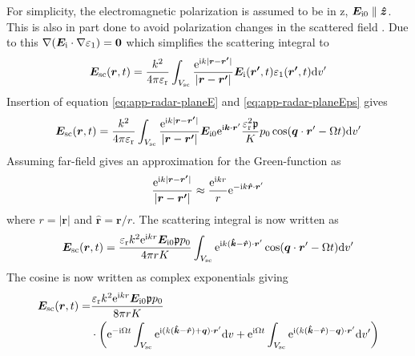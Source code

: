 \documentclass[11pt,twoside]{eitExjobb}
\begin{document}
	For simplicity, the electromagnetic polarization is assumed to be in z, $\bm{E}_{\mathrm{i}0} \parallel \bm{\hat{z}}$. This is also in part done to avoid polarization changes in the scattered field \cite{Korpel1988}. Due to this $\nabla(\bm{E}_{\mathrm{i}} \cdot \nabla \varepsilon_1) = \bm{0}$ which simplifies the scattering integral to
	\begin{equation*}
		\bm{E}_{\mathrm{sc}}(\bm{r},t) = \frac{k^2}{4\pi\varepsilon_{\mathrm{r}}} \int_{V_{\mathrm{sc}}} \frac{\mathrm{e}^{\mathrm{i} k |\bm{r}-\bm{r'}| }}{ |\bm{r}-\bm{r'}|} \bm{E}_{\mathrm{i}} (\bm{r'},t) \varepsilon_1 (\bm{r'},t) \mathrm{d}v'
	\end{equation*}
	Insertion of equation \eqref{eq:app-radar-planeE} and \eqref{eq:app-radar-planeEps} gives
	\begin{equation*}
		\bm{E}_{\mathrm{sc}}(\bm{r},t) = \frac{k^2}{4\pi\varepsilon_{\mathrm{r}}} \int_{V_{\mathrm{sc}}} \frac{\mathrm{e}^{\mathrm{i} k |\bm{r}-\bm{r'}| }}{ |\bm{r}-\bm{r'}|} \bm{E}_{\mathrm{i}0} \mathrm{e}^{\mathrm{i} \bm{k} \cdot \bm{r}'} \frac{\varepsilon_{\mathrm{r}}^2 \mathfrak{p}}{K} p_0 \cos(\bm{q} \cdot \bm{r}' - \Omega t) \mathrm{d}v'
	\end{equation*}
	Assuming far-field gives an approximation for the Green-function as \cite{Kristensson2008}
	\begin{equation*}
		\frac{\mathrm{e}^{\mathrm{i} k |\bm{r}-\bm{r'}| }}{ |\bm{r}-\bm{r'}|} \approx \frac{\mathrm{e}^{\mathrm{i} kr}}{r} \mathrm{e}^{-\mathrm{i} k \bm{\hat{r}} \cdot \bm{r}'}
	\end{equation*}
	where $r = |\bm{r}|$ and $\bm{\hat{r}} = \bm{r}/r$. The scattering integral is now written as
	\begin{equation*}
		\bm{E}_{\mathrm{sc}}(\bm{r},t) = \frac{\varepsilon_{\mathrm{r}}k^2 \mathrm{e}^{\mathrm{i} kr} \bm{E}_{\mathrm{i}0} \mathfrak{p} p_0}{4\pi r K} \int_{V_{\mathrm{sc}}} \mathrm{e}^{\mathrm{i} k ( \bm{\hat{k}} - \bm{\hat{r}} ) \cdot \bm{r}'} \cos(\bm{q} \cdot \bm{r}' - \Omega t) \mathrm{d}v'
	\end{equation*}
	The cosine is now written as complex exponentials giving
	\begin{equation*}
	\begin{split}
			\bm{E}_{\mathrm{sc}}(\bm{r},t) =& \frac{\varepsilon_{\mathrm{r}}k^2 \mathrm{e}^{\mathrm{i} kr} \bm{E}_{\mathrm{i}0} \mathfrak{p} p_0}{8\pi r K} \\
			&\cdot \left( \mathrm{e}^{-\mathrm{i} \Omega t} \int_{V_{\mathrm{sc}}} \mathrm{e}^{\mathrm{i} ( k(\bm{\hat{k}} - \bm{\hat{r}}) + \bm{q} ) \cdot \bm{r}'} \mathrm{d}v + \mathrm{e}^{\mathrm{i} \Omega t} \int_{V_{\mathrm{sc}}} \mathrm{e}^{\mathrm{i} ( k(\bm{\hat{k}} - \bm{\hat{r}}) - \bm{q} ) \cdot \bm{r}'} \mathrm{d}v' \right)
	\end{split}
	\end{equation*}
\end{document}
